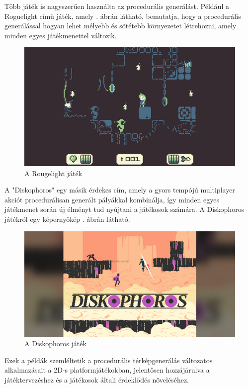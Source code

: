 Több játék is nagyszerűen használta az procedurális generálást. Például a Roguelight című játék, amely . ábrán látható, bemutatja, hogy a procedurális generálással hogyan lehet mélyebb és sötétebb környezetet létrehozni, amely minden egyes játékmenettel változik.

\begin{figure}[ht]
\centering
\includegraphics[scale = 0.2]{images/rougelight.jpg}
\caption{A Rougelight játék}
\label{fig:rougelight}
\end{figure}

A "Diskophoros" egy másik érdekes cím, amely a gyors tempójú multiplayer akciót procedurálisan generált pályákkal kombinálja, így minden egyes játékmenet során új élményt tud nyújtani a játékosok számára. A Diskophoros játékról egy képernyőkép . ábrán látható.

\begin{figure}[ht]
\centering
\includegraphics[scale = 0.7]{images/diskophoros.png}
\caption{A Diskophoros játék}
\label{fig:diskophoros}
\end{figure}

Ezek a példák szemléltetik a procedurális térképgenerálás változatos alkalmazásait a 2D-s platformjátékokban, jelentősen hozzájárulva a játéktervezéshez és a játékosok általi érdeklődés növeléséhez.


